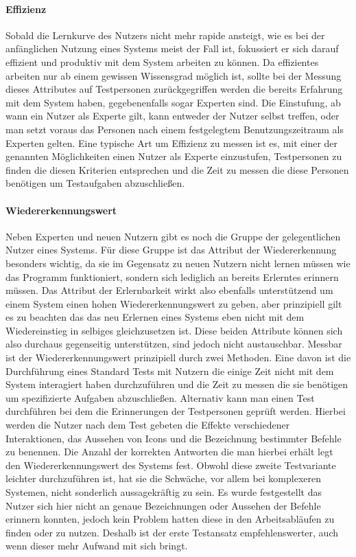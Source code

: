 \paragraph{Effizienz}
Sobald die Lernkurve des Nutzers nicht mehr rapide ansteigt, wie es bei der anfänglichen Nutzung eines Systems meist der Fall ist, fokussiert er sich darauf effizient  und produktiv mit dem System arbeiten zu können.
Da effizientes arbeiten nur ab einem gewissen Wissensgrad möglich ist, sollte bei der Messung dieses Attributes auf Testpersonen zurückgegriffen werden die bereits Erfahrung mit dem System haben, gegebenenfalls sogar Experten sind.
Die Einstufung, ab wann ein Nutzer als Experte gilt, kann entweder der Nutzer selbst treffen, oder man setzt voraus das Personen nach einem festgelegtem Benutzungszeitraum als Experten gelten.
Eine typische Art um Effizienz zu messen ist es, mit einer der genannten Möglichkeiten einen Nutzer als Experte einzustufen, Testpersonen zu finden die diesen Kriterien entsprechen und die Zeit zu messen die diese Personen benötigen um Testaufgaben abzuschließen\cite{Nielsen.1995?}.

\paragraph{Wiedererkennungswert}
Neben Experten und neuen Nutzern gibt es noch die Gruppe der gelegentlichen Nutzer eines Systems.
Für diese Gruppe ist das Attribut der Wiedererkennung besonders wichtig, da sie im Gegensatz zu neuen Nutzern nicht lernen müssen wie das Programm funktioniert, sondern sich lediglich an bereits Erlerntes erinnern müssen.
Das Attribut der Erlernbarkeit wirkt also ebenfalls unterstützend um einem System einen hohen Wiedererkennungswert zu geben, aber prinzipiell gilt es zu beachten das das neu Erlernen eines Systems eben nicht mit dem Wiedereinstieg in selbiges gleichzusetzen ist.
Diese beiden Attribute können sich also durchaus gegenseitig unterstützen, sind jedoch nicht austauschbar.
Messbar ist der Wiedererkennungswert prinzipiell durch zwei Methoden.
Eine davon ist die Durchführung eines Standard Tests mit Nutzern die einige Zeit nicht mit dem System interagiert haben durchzuführen und die Zeit zu messen die sie benötigen um spezifizierte Aufgaben abzuschließen.
Alternativ kann man einen Test durchführen bei dem die Erinnerungen der Testpersonen geprüft werden.
Hierbei werden die Nutzer nach dem Test gebeten die Effekte verschiedener Interaktionen, das Aussehen von Icons und die Bezeichnung bestimmter Befehle zu benennen.
Die Anzahl der korrekten Antworten die man hierbei erhält legt den Wiedererkennungswert des Systems fest.
Obwohl diese zweite Testvariante leichter durchzuführen ist, hat sie die Schwäche, vor allem bei komplexeren Systemen, nicht sonderlich aussagekräftig zu sein.
Es wurde festgestellt das Nutzer sich hier nicht an genaue Bezeichnungen oder Aussehen der Befehle erinnern konnten, jedoch kein Problem hatten diese in den Arbeitsabläufen zu finden oder zu nutzen.
Deshalb ist der erste Testansatz empfehlenswerter, auch wenn dieser mehr Aufwand mit sich bringt\cite{Nielsen.1995?}.

